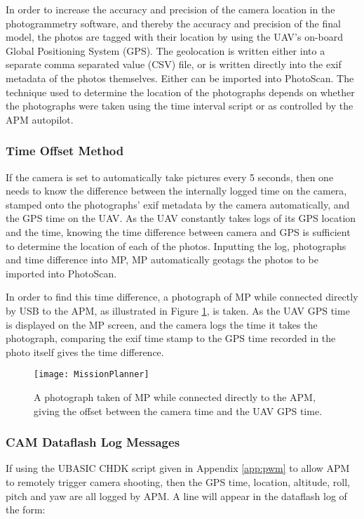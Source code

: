 In order to increase the accuracy and precision of the camera location in the
photogrammetry software, and thereby the accuracy and precision of the final
model, the photos are tagged with their location by using the UAV's on-board
Global Positioning System (GPS). The geolocation is written either into a
separate comma separated value (CSV) file, or is written directly into the exif
metadata of the photos themselves. Either can be imported into PhotoScan. The
technique used to determine the location of the photographs depends on whether
the photographs were taken using the time interval script or as controlled by
the APM autopilot.

\subsubsection{Time Offset Method}

If the camera is set to automatically take pictures every 5 seconds, then one
needs to know the difference between the internally logged time on the camera,
stamped onto the photographs' exif metadata by the camera automatically, and the
GPS time on the UAV. As the UAV constantly takes logs of its GPS location and
the time, knowing the time difference between camera and GPS is sufficient to
determine the location of each of the photos. Inputting the log, photographs and
time difference into MP, MP automatically geotags the photos to be imported into
PhotoScan.

In order to find this time difference, a photograph of MP while connected
directly by USB to the APM, as illustrated in Figure \ref{img:mission-planner},
is taken. As the UAV GPS time is displayed on the MP screen, and the camera logs
the time it takes the photograph, comparing the exif time stamp to the GPS time
recorded in the photo itself gives the time difference.

\begin{figure}
    \centering
    \texttt{[image: MissionPlanner]}
    \caption{A photograph taken of MP while connected directly to the APM,
        giving the offset between the camera time and the UAV GPS time.}
    \label{img:mission-planner}
\end{figure}

\subsubsection{CAM Dataflash Log Messages}

If using the UBASIC CHDK script given in Appendix \ref{app:pwm} to allow APM to
remotely trigger camera shooting, then the GPS time, location, altitude, roll,
pitch and yaw are all logged by APM. A line will appear in the dataflash log of
the form:

